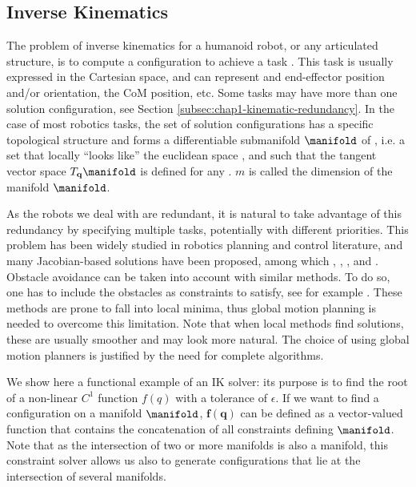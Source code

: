 \subsection{Inverse Kinematics}
\label{subsec:chap2-inverse-kinematics}

The problem of inverse kinematics for a humanoid robot, or any
articulated structure, is to compute a configuration \config{} to
achieve a task \task{}. This task is usually expressed in the
Cartesian space, and can represent and end-effector position and/or
orientation, the CoM position, etc. Some tasks may have more than one
solution configuration, see Section
\ref{subsec:chap1-kinematic-redundancy}. In the case of most robotics
tasks, the set of solution configurations has a specific topological
structure and forms a differentiable submanifold $\manifold$ of
{\cspace}, i.e. a set that locally ``looks like'' the euclidean
space , and such that the tangent vector space
$T_{\mathbf{q}}\manifold$ is defined for any \config{}. $m$ is called
the dimension of the manifold $\manifold$.

As the robots we deal with are redundant, it is natural to take
advantage of this redundancy by specifying multiple tasks, potentially
with different priorities. This problem has been widely studied in
robotics planning and control literature, and many Jacobian-based
solutions have been proposed, among which \cite{nakamura1986iks},
\cite{siciliano1991gfm}, \cite{baerlocher1998tpf},
\cite{khatib2004wbd} and \cite{kano09}. Obstacle avoidance can be
taken into account with similar methods. To do so, one has to include
the obstacles as constraints to satisfy, see for example
\cite{kanehiro2008local}. These methods are prone to fall into local
minima, thus global motion planning is needed to overcome this
limitation. Note that when local methods find solutions, these are
usually smoother and may look more natural. The choice of using global
motion planners is justified by the need for complete algorithms.

We show here a functional example of an IK solver: its purpose is to
find the root \config{} of a non-linear $C^1$ function $f(q)$ with a
tolerance of $\epsilon$. If we want to find a configuration on a
manifold $\manifold$, $\mathbf{f}(\mathbf{q})$ can be defined as a
vector-valued function that contains the concatenation of all
constraints defining $\manifold$. Note that as the intersection of two
or more manifolds is also a manifold, this constraint solver allows us
also to generate configurations that lie at the intersection of
several manifolds.

